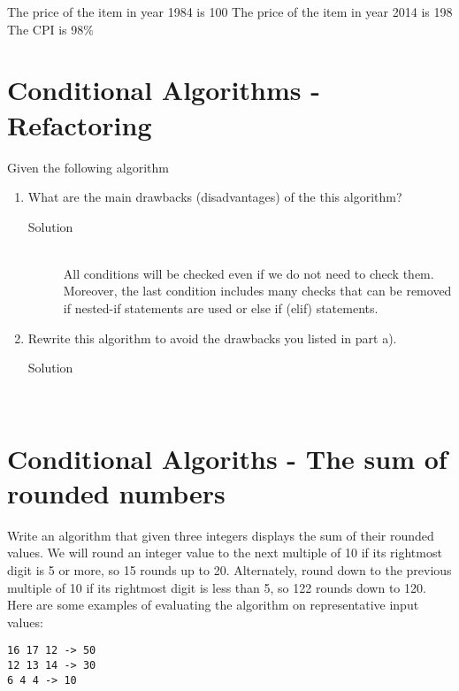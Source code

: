 \documentclass[11pt,a4paper]{article}
\begin{document}
The price of the item in year 1984 is 100
The price of the item in year 2014 is 198
The CPI is 98\%
\vfill

\vfill


\section{Conditional Algorithms - Refactoring}
Given the following algorithm




\begin{enumerate}[label=(\alph*)]
  \item What are the main drawbacks (disadvantages) of the this algorithm?
  \begin{description}
    \item[Solution] \hfill \\
    All conditions will be checked even if we do not need to check them. Moreover, the last condition includes
many checks that can be removed if nested-if statements are used or else if (elif) statements.
  \end{description}
  \item Rewrite this algorithm to avoid the drawbacks you listed in part a).
  \begin{description}
    \item[Solution] \hfill \\
    
  \end{description}
\end{enumerate}
\vfill

\section{Conditional Algoriths - The sum of rounded numbers}
Write an algorithm that given three integers displays the sum of their rounded values.
We will round an integer value to the next multiple of 10 if its rightmost digit is 5 or more, so 15 rounds up to 20.
Alternately, round down to the previous multiple of 10 if its rightmost digit is less than 5, so 122 rounds down to
120.
Here are some examples of evaluating the algorithm on representative input values:
\begin{verbatim}
16 17 12 -> 50
12 13 14 -> 30
6 4 4 -> 10
\end{verbatim}

\vfill
\end{document}
